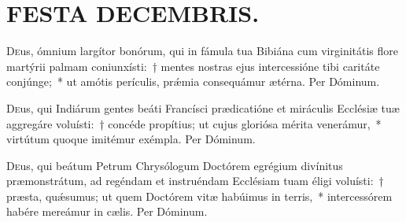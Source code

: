 \documentclass[vesperale_romanum.tex]{subfiles}
\begin{document}
\myrule

\newpage
\thispagestyle{empty}
\section[Festa Decembris.]{FESTA DECEMBRIS.}


\semiduplex

\oratio

\lettrine{D}{e}us, ómnium largítor bonórum, qui in fámula tua Bibiána cum virginitátis flore martýrii palmam coniunxísti:~† mentes nostras ejus intercessióne tibi caritáte conjúnge;~* ut amótis perículis, prǽmia consequámur ætérna.
Per Dóminum.



\myrule



\duplexmajus

\oratio

\lettrine{D}{e}us, qui Indiárum gentes beáti Francísci prædicatióne et miráculis Ecclésiæ tuæ aggregáre voluísti:~† concéde propítius; ut cujus gloriósa mérita venerámur,~* virtútum quoque imitémur exémpla. Per Dóminum.



\myrule


\duplexmtv


\oratio

\lettrine{D}{e}us, qui beátum Petrum Chrysólogum Doctórem egrégium divínitus præmonstrátum, ad regéndam et instruéndam Ecclésiam tuam éligi voluísti:~† præsta, quǽsumus; ut quem Doctórem vitæ habúimus in terris,~* intercessórem habére mereámur in cælis. Per Dóminum.
\end{document}
